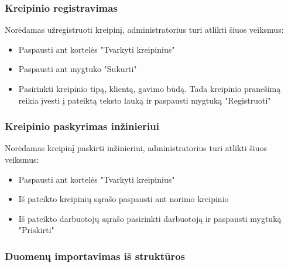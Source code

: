 	\subsubsection{Kreipinio registravimas}


	Norėdamas užregistruoti kreipinį, administratorius turi atlikti šiuos veiksmus:
	\begin{itemize}
		\item Paspausti ant kortelės "Tvarkyti kreipinius" 
		\item Paspausti ant mygtuko "Sukurti" 
		\item Pasirinkti kreipinio tipą, klientą, gavimo būdą. Tada kreipinio pranešimą reikia įvesti į pateiktą teksto lauką ir paspausti mygtuką "Registruoti" 
	\end{itemize}

	\subsubsection{Kreipinio paskyrimas inžinieriui}


	Norėdamas kreipinį paskirti inžinieriui, administratorius turi atlikti šiuos veiksmus:
	\begin{itemize}
		\item Paspausti ant kortelės "Tvarkyti kreipinius" 
		\item Iš pateikto kreipinių sąrašo paspausti ant norimo kreipinio 
		\item Iš pateikto darbuotojų sąrašo pasirinkti darbuotoją ir paspausti mygtuką "Priskirti" 
	\end{itemize}

	\subsubsection{Duomenų importavimas iš struktūros}

